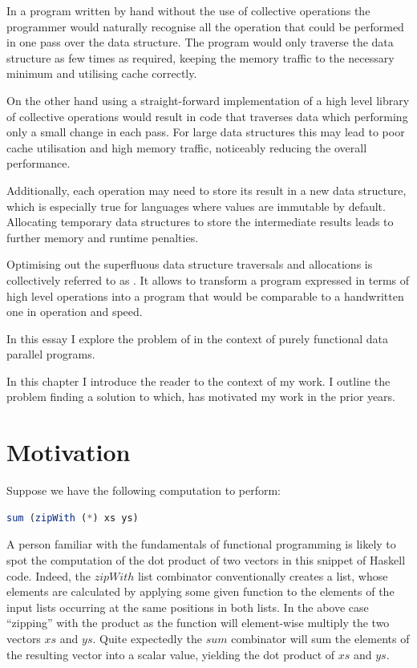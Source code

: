 \documentclass[preamble.tex]{subfiles}
\begin{document}
In a program written by hand without the use of collective operations the programmer would naturally recognise all the operation that could be performed in one pass over the data structure. The program would only traverse the data structure as few times as required, keeping the memory traffic to the necessary minimum and utilising cache correctly.

On the other hand using a straight-forward implementation of a high level library of collective operations would result in code that traverses data which performing only a small change in each pass. For large data structures this may lead to poor cache utilisation and high memory traffic, noticeably reducing the overall performance.

Additionally, each operation may need to store its result in a new data structure, which is especially true for languages where values are immutable by default. Allocating temporary data structures to store the intermediate results leads to further memory and runtime penalties.

Optimising out the superfluous data structure traversals and allocations is collectively referred to as . It allows to transform a program expressed in terms of high level operations into a program that would be comparable to a handwritten one in operation and speed.

In this essay I explore the problem of  in the context of purely functional data parallel programs.

In this chapter I introduce the reader to the context of my work. I outline the problem finding a solution to which, has motivated my work in the prior years.


\pagebreak
\section{Motivation}

Suppose we have the following computation to perform:

\begin{lstlisting}[basicstyle={\ttfamily},language=Haskell,tabsize=4]
sum (zipWith (*) xs ys)
\end{lstlisting}


A person familiar with the fundamentals of functional programming is likely to spot the computation of the dot product of two vectors in this snippet of Haskell code. Indeed, the $zipWith$ list combinator conventionally creates a list, whose elements are calculated by applying some given function to the elements of the input lists occurring at the same positions in both lists. In the above case {}``zipping'' with the product as the function will element-wise multiply the two vectors $xs$ and $ys$. Quite expectedly the $sum$ combinator will sum the elements of the resulting vector into a scalar value, yielding the dot product of $xs$ and $ys$.
\end{document}
